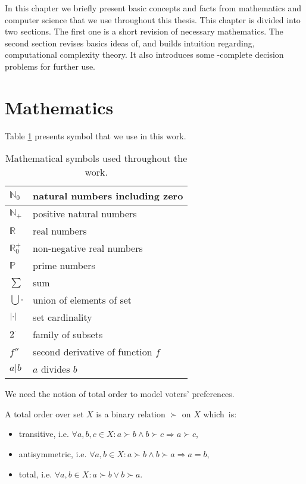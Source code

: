 In this chapter we briefly present basic concepts and facts from mathematics and computer science
that we use throughout this thesis.
This chapter is divided into two sections.
The first one is a short revision of necessary mathematics.
The second section revises basics ideas of, and builds intuition regarding, computational complexity theory.
It also introduces some \np-complete decision problems for further use.


\section{Mathematics}

Table \ref{symbols} presents symbol that we use in this work.

\begin{table} \centering
\begin{tabular}{| l | l |} \hline
	$\mathbb{N}_0$	& natural numbers including zero \\ \hline
	$\mathbb{N}_+$	& positive natural numbers \\ \hline
	$\mathbb{R}$	& real numbers \\ \hline
	$\mathbb{R}_0^+$& non-negative real numbers \\ \hline
	$\mathbb{P}$	& prime numbers \\ \hline
	$\sum$	& sum \\ \hline 
	$\bigcup \cdot$	& union of elements of set\\ \hline
	$\left\vert \cdot \right\vert$	& set cardinality \\ \hline
	$2^\cdot$		& family of subsets \\ \hline
	$f''$			& second derivative of function $f$ \\ \hline
  $ a | b$              & $a$ divides $b$ \\ \hline
\end{tabular}
\caption{Mathematical symbols used throughout the work.} \label{symbols}
\end{table}

We need the notion of total order to model voters' preferences.

\begin{defn}
A total order over set $X$ is a binary relation $\succ$ on $X$ which~is:
\begin{itemize}
	\item transitive, i.e. $\forall a,b,c \in X: a \succ b \land b \succ c \Rightarrow a \succ c$,
	\item antisymmetric, i.e. $\forall a,b \in X: a \succ b \land b \succ a \Rightarrow a=b $,
	\item total, i.e. $\forall a,b \in X: a \succ b \lor b \succ a$.
\end{itemize}
\end{defn}

